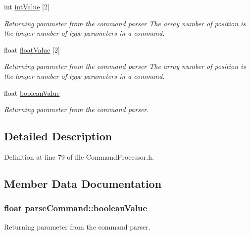 \begin{DoxyCompactItemize}
int \hyperlink{structparse_command_a9ad775810b79683631510fd333096c6f}{int\-Value} \mbox{[}2\mbox{]}
\begin{DoxyCompactList}\small\item\em Returning parameter from the command parser The array number of position is the longer number of type parameters in a command. \end{DoxyCompactList}\item 
float \hyperlink{structparse_command_a475f06e9e3728cc583008ad66dc48329}{float\-Value} \mbox{[}2\mbox{]}
\begin{DoxyCompactList}\small\item\em Returning parameter from the command parser The array number of position is the longer number of type parameters in a command. \end{DoxyCompactList}\item 
float \hyperlink{structparse_command_aff75594be6413210138456dc4572be52}{boolean\-Value}
\begin{DoxyCompactList}\small\item\em Returning parameter from the command parser. \end{DoxyCompactList}\end{DoxyCompactItemize}


\subsection{Detailed Description}


Definition at line 79 of file Command\-Processor.\-h.



\subsection{Member Data Documentation}
\hypertarget{structparse_command_aff75594be6413210138456dc4572be52}{
\subsubsection[{boolean\-Value}]{\setlength{\rightskip}{0pt plus 5cm}float parse\-Command\-::boolean\-Value}}\label{structparse_command_aff75594be6413210138456dc4572be52}


Returning parameter from the command parser. 



